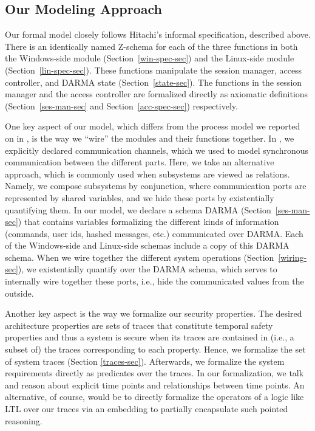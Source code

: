 \documentclass[a4paper,pdftex]{article}
\begin{document}
\subsection{Our Modeling Approach} \label{mod-approach}

Our formal model closely follows Hitachi's informal specification,
described above. There is an identically named Z-schema for each of the
three functions in both the Windows-side module
(Section~\ref{win-spec-sec}) and the Linux-side module
(Section~\ref{lin-spec-sec}).  These functions manipulate the session
manager, access controller, and DARMA state (Section~\ref{state-sec}).
The functions in the session manager and the access controller are
formalized directly as axiomatic definitions (Section~\ref{ses-man-sec}
and Section~\ref{acc-spec-sec}) respectively.

One key aspect of our model, which differs from the process model we
reported on in \cite{iicis03}, is the way we ``wire'' the modules and
their functions together.  In \cite{iicis03}, we explicitly declared
communication channels, which we used to model synchronous communication
between the different parts.  Here, we take an alternative approach,
which is commonly used when subsystems are viewed as relations.  Namely,
we compose subsystems by conjunction, where communication ports are
represented by shared variables, and we hide these ports by existentially
quantifying them.  In our model, we declare a schema DARMA
(Section~\ref{ses-man-sec}) that contains variables formalizing the
different kinds of information (commands, user ids, hashed messages, etc.)
communicated over DARMA.  Each of the Windows-side and Linux-side schemas
include a copy of this DARMA schema.  When we wire together the
different system operations (Section~\ref{wiring-sec}), we existentially
quantify over the DARMA schema, which serves to internally wire together
these ports, i.e., hide the communicated values from the outside. 

Another key aspect is the way we formalize our security properties.  The
desired architecture properties are sets of traces that constitute 
temporal safety properties and thus a system is secure when its traces are
contained in (i.e., a subset of) the traces corresponding to each
property.  Hence, we formalize the set of system traces (Section
\ref{traces-sec}). Afterwards, we formalize the system requirements
directly as predicates over the traces.  In our formalization, we talk
and reason about explicit time points and relationships between time
points. An alternative, of course, would be to directly formalize the
operators of a logic like LTL over our traces via an embedding to
partially encapsulate such pointed reasoning.
\end{document}
